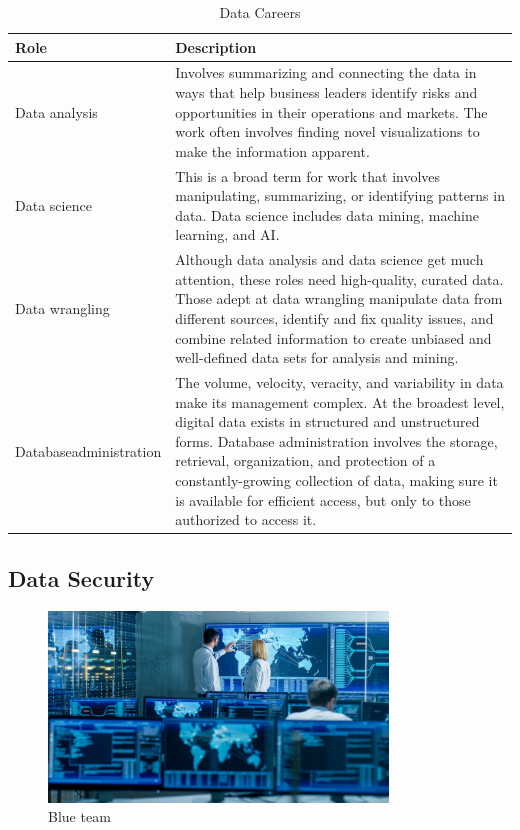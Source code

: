 \begin{table}[H]
	\begin{center}
		\caption{Data Careers}
		\vskip 4pt
		\begin{tabular}{p{1in}|p{3.4in}} 
			\textbf{Role} & \textbf{Description}\\
			\hline
			Data analysis & Involves summarizing and connecting the data in ways that help business leaders identify risks and opportunities in their operations and markets. The work often involves finding novel visualizations to make the information apparent.\\
			\hline
			Data science & This is a broad term for work that involves manipulating, summarizing, or identifying patterns in data. Data science includes data mining, machine learning, and AI.\\
			\hline
			Data wrangling & Although data analysis and data science get much attention, these roles need high-quality, curated data. Those adept at data wrangling manipulate data from different sources, identify and fix quality issues, and combine related information to create unbiased and well-defined data sets for analysis and mining.\\
			\hline
			Database\linebreak administration & The volume, velocity, veracity, and variability in data make its management complex. At the broadest level, digital data exists in structured and unstructured forms. Database administration involves the storage, retrieval, organization, and protection of a constantly-growing collection of data, making sure it is available for efficient access, but only to those authorized to access it.\\
			\hline
		\end{tabular}
	\end{center}
\end{table}

\subsection{Data Security}


\begin{figure}[H]
	\begin{center}
		\caption{Blue team}
		\vskip 4pt
		\includegraphics[height=2in]{images/careers/iStock-949581032.small.jpg}
	\end{center}
\end{figure}

